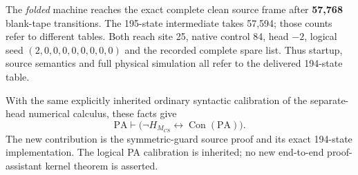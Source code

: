 The \emph{folded} machine reaches the exact complete clean source frame
after \textbf{57,768} blank-tape transitions. The 195-state intermediate
takes 57,594; those counts refer to different tables. Both reach site 25,
native control 84, head $-2$, logical seed $(2,0,0,0,0,0,0,0,0)$ and the
recorded complete spare list. Thus startup, source semantics and full
physical simulation all refer to the delivered 194-state table.

With the same explicitly inherited ordinary syntactic calibration of the
separate-head numerical calculus, these facts give
\[
 \mathrm{PA}\vdash
 \bigl(\neg H_{M_{CS}}\leftrightarrow\operatorname{Con}(\mathrm{PA})\bigr).
\]
The new contribution is the symmetric-guard source proof and its exact
194-state implementation. The logical PA calibration is inherited;
no new end-to-end proof-assistant kernel theorem is asserted.
